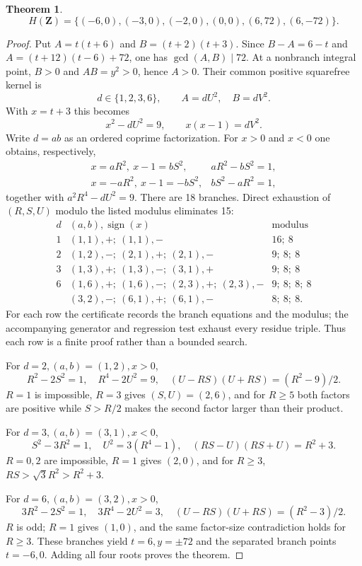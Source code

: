 \documentclass[11pt]{article}
\newtheorem{theorem}{Theorem}
\begin{document}
\begin{theorem}\label{thm:H}
\[
 H(\mathbf Z)=\{(-6,0),(-3,0),(-2,0),(0,0),(6,72),(6,-72)\}.
\]
\end{theorem}
\begin{proof}
Put $A=t(t+6)$ and $B=(t+2)(t+3)$. Since $B-A=6-t$ and
$A=(t+12)(t-6)+72$, one has $\gcd(A,B)\mid72$. At a nonbranch integral
point, $B>0$ and $AB=y^2>0$, hence $A>0$. Their common positive
squarefree kernel is
\[
 d\in\{1,2,3,6\},\qquad A=dU^2,\quad B=dV^2.
\]
With $x=t+3$ this becomes
\[
 x^2-dU^2=9,\qquad x(x-1)=dV^2.
\]
Write $d=ab$ as an ordered coprime factorization. For $x>0$ and $x<0$
one obtains, respectively,
\[
\begin{array}{ll}
x=aR^2,\ x-1=bS^2,&aR^2-bS^2=1,\\
x=-aR^2,\ x-1=-bS^2,&bS^2-aR^2=1,
\end{array}
\]
together with $a^2R^4-dU^2=9$. There are 18 branches. Direct exhaustion
of $(R,S,U)$ modulo the listed modulus eliminates 15:
\[
\begin{array}{c|c|c}
d&(a,b),\operatorname{sign}(x)&\text{modulus}\\ \hline
1&(1,1),+;\ (1,1),-&16;\ 8\\
2&(1,2),-;\ (2,1),+;\ (2,1),-&9;\ 8;\ 8\\
3&(1,3),+;\ (1,3),-;\ (3,1),+&9;\ 8;\ 8\\
6&(1,6),+;\ (1,6),-;\ (2,3),+;\ (2,3),-&9;\ 8;\ 8;\ 8\\
 &(3,2),-;\ (6,1),+;\ (6,1),-&8;\ 8;\ 8.
\end{array}
\]
For each row the certificate records the branch equations and the modulus;
the accompanying generator and regression test exhaust every residue triple.
Thus each row is a finite proof rather than a bounded search.

For $d=2,(a,b)=(1,2),x>0$,
\[
 R^2-2S^2=1,\quad R^4-2U^2=9,\quad
 (U-RS)(U+RS)=(R^2-9)/2.
\]
$R=1$ is impossible, $R=3$ gives $(S,U)=(2,6)$, and for $R\ge5$ both
factors are positive while $S>R/2$ makes the second factor larger than
their product.

For $d=3,(a,b)=(3,1),x<0$,
\[
 S^2-3R^2=1,\quad U^2=3(R^4-1),\quad
 (RS-U)(RS+U)=R^2+3.
\]
$R=0,2$ are impossible, $R=1$ gives $(2,0)$, and for $R\ge3$,
$RS>\sqrt3R^2>R^2+3$.

For $d=6,(a,b)=(3,2),x>0$,
\[
 3R^2-2S^2=1,\quad3R^4-2U^2=3,\quad
 (U-RS)(U+RS)=(R^2-3)/2.
\]
$R$ is odd; $R=1$ gives $(1,0)$, and the same factor-size contradiction
holds for $R\ge3$. These branches yield $t=6,y=\pm72$ and the separated
branch points $t=-6,0$. Adding all four roots proves the theorem.
\end{proof}
\end{document}
